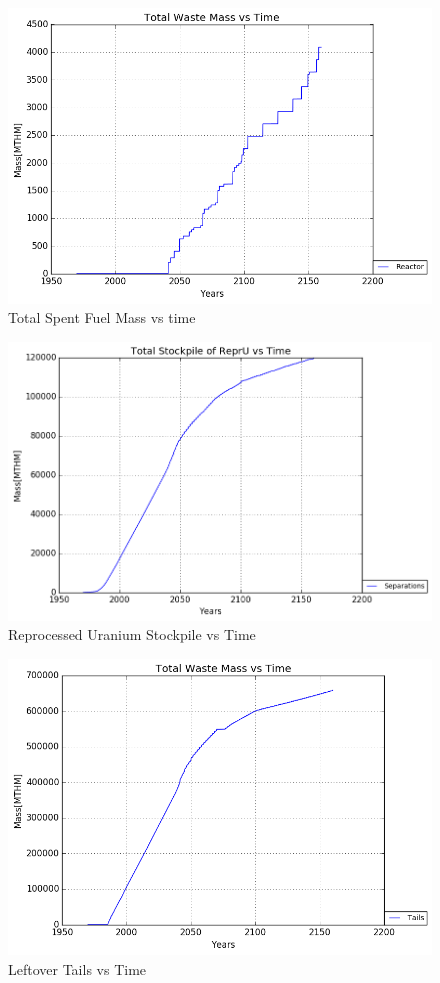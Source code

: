 \begin{figure}
	\includegraphics[width=\linewidth]{./images/fr/Reactor_total_Waste.png}
	\caption{Total Spent Fuel Mass vs time}
	\label{fig:fr_reactor_waste}
\end{figure}

\begin{figure}
	\includegraphics[width=\linewidth]{./images/fr/Separations_Total_Stockpile.png}
	\caption{Reprocessed Uranium Stockpile vs Time}
	\label{fig:fr_fuel}
\end{figure}

\begin{figure}
	\includegraphics[width=\linewidth]{./images/fr/Tails_total_Waste.png}
	\caption{Leftover Tails vs Time}
	\label{fig:fr_tails}
\end{figure}
